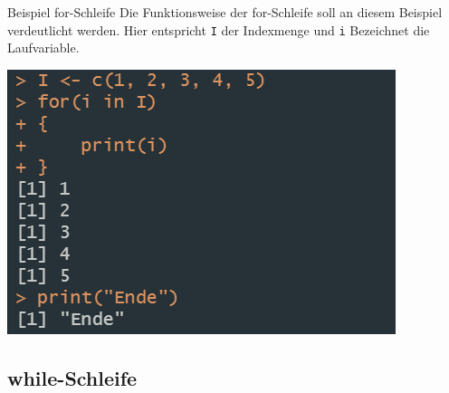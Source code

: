 \documentclass[aspectratio = 169]{chariteBeamer}
\begin{document}
\begin{frame}[fragile]{Beispiel for-Schleife}
  Die Funktionsweise der for-Schleife soll an diesem Beispiel verdeutlicht werden. Hier entspricht \verb+I+ der Indexmenge und \verb+i+ Bezeichnet die Laufvariable.\bigskip\\
  \begin{centering}
  \includegraphics[]{for1.png}
  \end{centering}
\end{frame}

\subsection*{while-Schleife}
\end{document}
